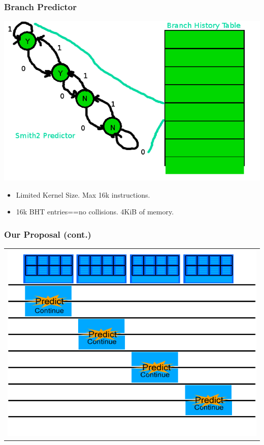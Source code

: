 \documentclass{beamer}
\begin{document}
\begin{frame}
    \frametitle{Branch Predictor}
    \includegraphics[height=.6\textheight]{bht.png}
    \begin{itemize}
     \item<1-> Limited Kernel Size.  Max 16k instructions.
     \item<2-> 16k BHT entries==no collisions.  4KiB of memory.
    \end{itemize}
\end{frame}


\begin{frame}
	\frametitle{Our Proposal (cont.)}
	\begin{tabular}{c}
		\includegraphics[width=.75\textwidth]{GPU-predict-context.jpg}
	\end{tabular}
\end{frame}
\end{document}

